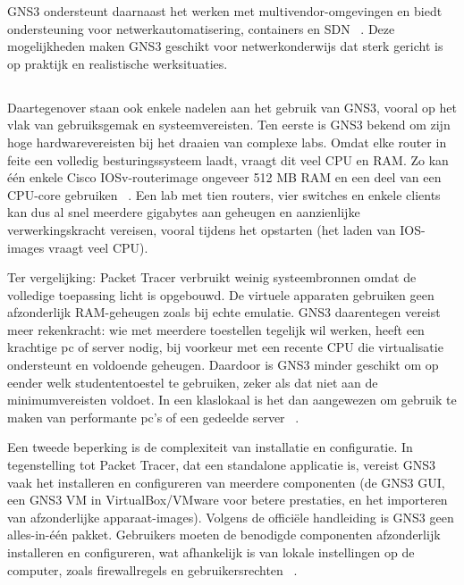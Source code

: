 \vspace{0.3cm}

GNS3 ondersteunt daarnaast het werken met multivendor-omgevingen en biedt ondersteuning voor netwerkautomatisering, containers en SDN ~\autocite{Kuzmenko2016}. Deze mogelijkheden maken GNS3 geschikt voor netwerkonderwijs dat sterk gericht is op praktijk en realistische werksituaties.



\subsection{}
\label{sec:Beperkingen}

Daartegenover staan ook enkele nadelen aan het gebruik van GNS3, vooral op het vlak van gebruiksgemak en systeemvereisten. Ten eerste is GNS3 bekend om zijn hoge hardwarevereisten bij het draaien van complexe labs. Omdat elke router in feite een volledig besturingssysteem laadt, vraagt dit veel CPU en RAM. Zo kan één enkele Cisco IOSv-routerimage ongeveer 512 MB RAM en een deel van een CPU-core gebruiken ~\autocite{cml_faq2025}. Een lab met tien routers, vier switches en enkele clients kan dus al snel meerdere gigabytes aan geheugen en aanzienlijke verwerkingskracht vereisen, vooral tijdens het opstarten (het laden van IOS-images vraagt veel CPU).

\vspace{0.3cm}

Ter vergelijking: Packet Tracer verbruikt weinig systeembronnen omdat de volledige toepassing licht is opgebouwd. De virtuele apparaten gebruiken geen afzonderlijk RAM-geheugen zoals bij echte emulatie. GNS3 daarentegen vereist meer rekenkracht: wie met meerdere toestellen tegelijk wil werken, heeft een krachtige pc of server nodig, bij voorkeur met een recente CPU die virtualisatie ondersteunt en voldoende geheugen. Daardoor is GNS3 minder geschikt om op eender welk studententoestel te gebruiken, zeker als dat niet aan de minimumvereisten voldoet. In een klaslokaal is het dan aangewezen om gebruik te maken van performante pc’s of een gedeelde server ~\autocite{Kuzmenko2016}.

\vspace{0.3cm}

Een tweede beperking is de complexiteit van installatie en configuratie. In tegenstelling tot Packet Tracer, dat een standalone applicatie is, vereist GNS3 vaak het installeren en configureren van meerdere componenten (de GNS3 GUI, een GNS3 VM in VirtualBox/VMware voor betere prestaties, en het importeren van afzonderlijke apparaat-images). Volgens de officiële handleiding is GNS3 geen alles-in-één pakket. Gebruikers moeten de benodigde componenten afzonderlijk installeren en configureren, wat afhankelijk is van lokale instellingen op de computer, zoals firewallregels en gebruikersrechten ~\autocite{Golightly2023}.

